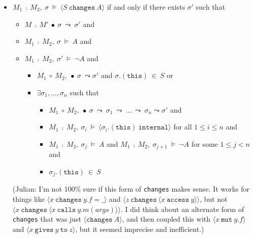 \documentclass[12pt]{article}
\newcommand{\constrained}{\mathrel{\leadsto\ \!\!\!\!{\raisebox{1pt}{$\mathsmaller{\mathsmaller{\mathsmaller{\mathsmaller\rvert}}}$}}}}
\newcommand{\reduction}[4]{#1\ \fcmp\ #2\ \bullet\ #3\ \leadsto\ #4}
\newcommand\mut[3]{\langle #1\ \texttt{mut}\ #2.#3 \rangle}
\newcommand\gives[3]{\langle #1\ \texttt{gives}\ #2\ \texttt{to}\ #3 \rangle}
\newcommand\calls[4]{\langle #1\ \texttt{calls}\ #2.#3(#4) \rangle}
\newcommand\changes[2]{\langle #1\ \texttt{changes}\ #2 \rangle}
\newcommand\access[2]{\langle #1\ \texttt{access}\ #2 \rangle}
\newcommand\internal[1]{\langle #1\ \texttt{internal}\rangle}
\numberwithin{case}{lemma}
\numberwithin{case}{theorem}
\numberwithin{subcase}{case}
\begin{document}
\begin{itemize}
\item
$M_1\ \fcmp\ M_2,\ \sigma\ \vDash\ \changes {S} {A}$ if and only if there exists $\sigma'$ such that 
\begin{itemize}
\item
$\reduction{M}{M'}{\sigma}{\sigma'}$ and
\item
$M_1\ \fcmp\ M_2,\ \sigma\ \vDash\ A$ and
\item
$M_1\ \fcmp\ M_2,\ \sigma'\ \vDash\ \neg A$ and
\begin{itemize}
\item
$M_1\ \circ\ M_2,\ \bullet\ \sigma\ \leadsto \sigma'$ and $\sigma.(\texttt{this})\ \in\ S$ or
\item
$\exists \sigma_1, \ldots, \sigma_n$ such that
\begin{itemize}
\item
$M_1\ \circ\ M_2,\ \bullet\ \sigma\ \leadsto\ \sigma_1\ \leadsto\ \ldots\ \leadsto\ \sigma_n \leadsto \sigma'$ and
\item
$M_1\ \fcmp\ M_2,\ \sigma_i\ \vDash\ \internal{\sigma_i.(\texttt{this})}$ for all $1 \leq i \leq n$ and
\item
$M_1\ \fcmp\ M_2,\ \sigma_j\ \vDash\ A$ and $M_1\ \fcmp\ M_2,\ \sigma_{j + 1}\ \vDash\ \neg A$ for some $1 \leq j < n$ and
\item
$\sigma_j.(\texttt{this})\ \in\ S$
\end{itemize}
\end{itemize}
\end{itemize}
{\color{red}(Julian: I'm not 100\% sure if this form of \texttt{changes} makes sense. It works for things like $\changes{x}{y.f=\_}$ and $\changes{z}{\access{x}{y}}$, but not $\changes{x}{\calls{x}{y}{m}{args}}$. I did think about an alternate form of \texttt{changes} that 
was just $\langle \texttt{changes}\ A \rangle$, and then coupled this with $\mut{x}{y}{f}$ and $\gives{x}{y}{z}$, but it seemed imprecise and inefficient.)}

\end{itemize}
\end{document}
